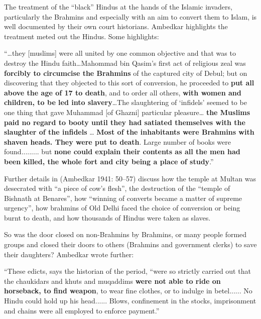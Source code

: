 The treatment of the “black” Hindus at the hands of the Islamic invaders, particularly the Brahmins and especially with an aim to convert them to Islam, is well documented by their own court historians. Ambedkar highlights the treatment meted out the Hindus. Some highlights:

\begin{myquote}
“…they [muslims] were all united by one common objective and that was to destroy the Hindu faith…Mahommad bin Qasim's first act of religious zeal was \textbf{forcibly to circumcise the Brahmins} of the captured city of Debul; but on discovering that they objected to this sort of conversion, he proceeded to \textbf{put all above the age of 17 to death}, and to order all others, \textbf{with women and children, to be led into slavery}…The slaughtering of ‘infidels’ seemed to be one thing that gave Muhammad [of Ghazni] particular pleasure… \textbf{the Muslims paid no regard to booty until they had satiated themselves with the slaughter of the infidels} … \textbf{Most of the inhabitants were Brahmins with shaven heads. They were put to death}. Large number of books were found......... but \textbf{none could explain their contents as all the men had been killed, the whole fort and city being a place of study}.”
\end{myquote}

Further details in (Ambedkar 1941: 50–57) discuss how the temple at Multan was desecrated with “a piece of cow’s flesh”, the destruction of the “temple of Bishnath at Benares”, how “winning of converts became a matter of supreme urgency”, how brahmins of Old Delhi faced the choice of conversion or being burnt to death, and how thousands of Hindus were taken as slaves.

So was the door closed on non-Brahmins by Brahmins, or many people formed groups and closed their doors to others (Brahmins and government clerks) to save their daughters? Ambedkar wrote further:

\begin{myquote}
“These edicts, says the historian of the period, “were so strictly carried out that the chaukidars and khuts and muqaddims \textbf{were not able to ride on horseback, to find weapon}, to wear fine clothes, or to indulge in betel...... No Hindu could hold up his head...... Blows, confinement in the stocks, imprisonment and chains were all employed to enforce payment.”
\end{myquote}

